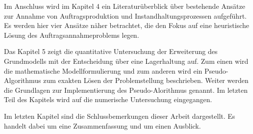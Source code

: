 Im Anschluss wird im Kapitel 4 ein Literaturüberblick über bestehende Ansätze zur Annahme von Auftragsproduktion und Instandhaltungsprozessen aufgeführt. Es werden hier vier Ansätze näher betrachtet, die den Fokus auf eine heuristische Lösung des Auftragsannahmeproblems legen.

Das Kapitel 5 zeigt die quantitative Untersuchung der Erweiterung des Grundmodells mit der Entscheidung über eine Lagerhaltung auf. Zum einen wird die  mathematische Modellformulierung und zum anderen wird ein Pseudo-Algorithmus zum exakten Lösen der Problemstellung beschrieben. Weiter werden die Grundlagen zur Implementierung des Pseudo-Alorithmus genannt. Im letzten Teil des Kapitels wird auf die numerische Untersuchung eingegangen.

Im letzten Kapitel sind die Schlussbemerkungen dieser Arbeit dargestellt. Es handelt dabei um eine Zusammenfassung und um einen Ausblick.